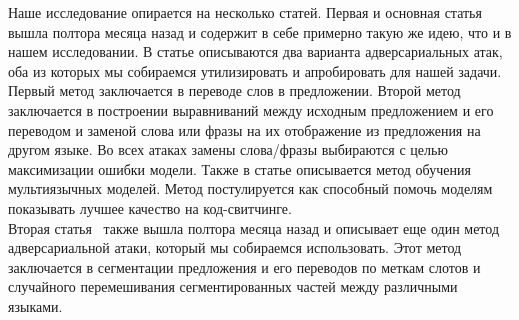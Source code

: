 Наше исследование опирается на несколько статей.
Первая и основная статья~\cite{Tan2021CodeMixingOS} вышла полтора месяца назад и содержит в себе примерно такую же идею, что и в нашем исследовании.
В статье описываются два варианта адверсариальных атак, оба из которых мы собираемся утилизировать и апробировать для нашей задачи.
Первый метод заключается в переводе слов в предложении.
Второй метод заключается в построении выравниваний между исходным предложением и его переводом и заменой слова или фразы на их отображение из предложения на другом языке.
Во всех атаках замены слова/фразы выбираются с целью максимизации ошибки модели.
Также в статье описывается метод обучения мультиязычных моделей.
Метод постулируется как способный помочь моделям показывать лучшее качество на код-свитчинге. \\
Вторая статья~\cite{Krishnan2021MultilingualCF} также вышла полтора месяца назад и описывает еще один метод адверсариальной атаки, который мы собираемся использовать.
Этот метод заключается в сегментации предложения и его переводов по меткам слотов и случайного перемешивания сегментированных частей между различными языками. \\
